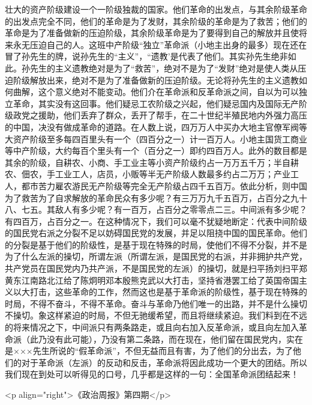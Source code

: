 壮大的资产阶级建设一个一阶级独裁的国家。他们革命的出发点，与其余阶级革命的出发点完全不同，他们的革命是为了发财，其余阶级的革命是为了救苦；他们的革命是为了准备做新的压迫阶级，其余阶级革命是为了要得到自己的解放并且使将来永无压迫自己的人。这班中产阶级“独立”革命派（小地主出身的最多）现在还在冒了孙先生的牌，说孙先生的“主义”，“遗教’是代表了他们。其实孙先生绝非如此。孙先生的主义遗教绝对是为了“救苦”，绝对不是为了“发财”绝对是使人类从压迫阶级解放出来，绝对不是为了准备做新的压迫阶级。无论将孙先生的主义遗教如何曲解，这个意义绝对不能变动。他们介在革命派和反革命派之间，自以为可以独立革命，其实没有这回事。他们疑忌工农阶级之兴起，他们疑忌国内及国际无产阶级政党之援助，他们丢弃了群众，丢开了帮手，在二十世纪半殖民地内外强力高压的中国，决没有做成革命的道路。在人数上说，四万万人中买办大地主官僚军阀等大资产阶级至多每四百里头有一个（四百分之一）计一百万人。小地主国货工商业等中产阶级，大约每百个里头有一个（百分之一）即约四百万人。此外的数目都是其余的阶级，自耕农、小商、手工业主等小资产阶级约占一万万五千万；半自耕农、佃农，手工业工人，店员，小贩等半无产阶级人数最多约占二万万；产业工人，都市苦力雇农游民无产阶级等完全无产阶级占四千五百万。依此分析，则中国为了救苦为了自求解放的革命民众有多少呢？有三万万九千五百万，占百分之九十八、七五。其敌人有多少呢？有一百万，占百分之零零点二三。中间派有多少呢？有四百万，占百分之一。在这种情况下，我们可以毫不犹疑地断定：代表中间阶级的国民党右派之分裂不足以妨碍国民党的发展，并足以阻挠中国的国民革命。他们的分裂是基于他们的阶级性，是基于现在特殊的时局，使他们不得不分裂，并不是为了什么左派的操切，所谓左派（所谓左派，是国民党的右派，并非拥护共产党，共产党员在国民党内乃共产派，不是国民党的左派）的操切，就是扫平扬刘扫平郑黄东江南路北江给了陈炯明邓本殷熊克武以大打击，坚持省港罢工给了英国帝国主义以大打击，这些革命的工作，然而这也是基于革命派的阶级性，基于现在特殊的时局，不得不奋斗，不得不革命。奋斗与革命乃他们唯一的出路，并不是什么操切不操切。象这样紧迫的时局，不但无驰缓希望，而且将继续紧迫。我们料到在不远的将来情况之下，中间派只有两条路走，或且向右加入反革命派，或且向左加入革命派（此乃没有此可能），乃没有第二条路，而在现在，他们留在国民党内，实在是×××先生所说的“假革命派”，不但无益而且有害，为了他们的分出去，为了他们的对于革命派（左派）的反动和反击，革命派将因此成功一个更大的团结。所以我们现在到处可以听得见的口号，几乎都是这样的一句：全国革命派团结起来！

<p align="right">《政治周报》第四期</p>

